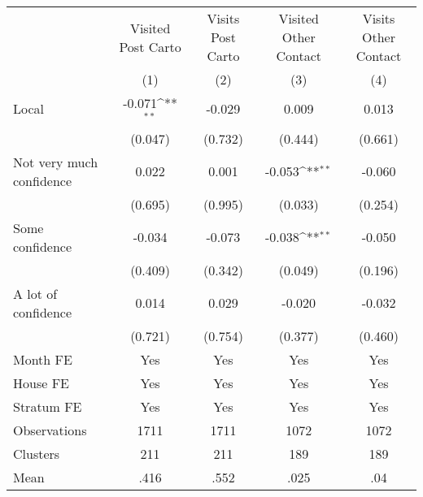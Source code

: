 {
\def\sym#1{\ifmmode^{#1}\else\(^{#1}\)\fi}
\begin{tabular}{l*{4}{c}}
\toprule
                &\multicolumn{1}{c}{Visited Post Carto}&\multicolumn{1}{c}{Visits Post Carto}&\multicolumn{1}{c}{Visited Other Contact}&\multicolumn{1}{c}{Visits Other Contact}\\
                &\multicolumn{1}{c}{(1)}         &\multicolumn{1}{c}{(2)}         &\multicolumn{1}{c}{(3)}         &\multicolumn{1}{c}{(4)}         \\
\midrule
Local           &   -0.071\sym{**} &   -0.029         &    0.009         &    0.013         \\
                &  (0.047)         &  (0.732)         &  (0.444)         &  (0.661)         \\
Not very much confidence&    0.022         &    0.001         &   -0.053\sym{**} &   -0.060         \\
                &  (0.695)         &  (0.995)         &  (0.033)         &  (0.254)         \\
Some confidence &   -0.034         &   -0.073         &   -0.038\sym{**} &   -0.050         \\
                &  (0.409)         &  (0.342)         &  (0.049)         &  (0.196)         \\
A lot of confidence&    0.014         &    0.029         &   -0.020         &   -0.032         \\
                &  (0.721)         &  (0.754)         &  (0.377)         &  (0.460)         \\
Month FE        &      Yes         &      Yes         &      Yes         &      Yes         \\
House FE        &      Yes         &      Yes         &      Yes         &      Yes         \\
Stratum FE      &      Yes         &      Yes         &      Yes         &      Yes         \\
\midrule
Observations    &     1711         &     1711         &     1072         &     1072         \\
Clusters        &      211         &      211         &      189         &      189         \\
Mean            &     .416         &     .552         &     .025         &      .04         \\
\bottomrule
\end{tabular}
}

